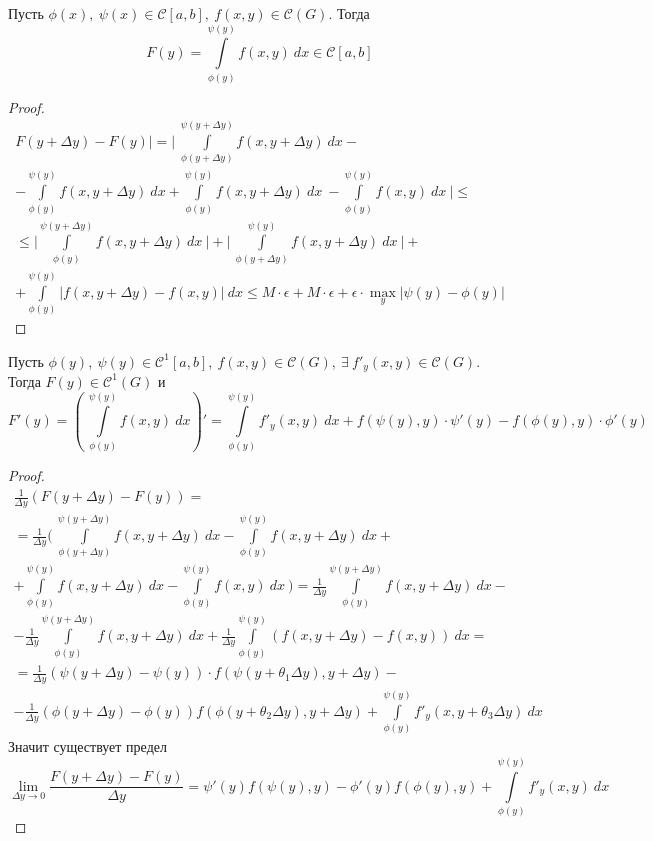 \begin{theorem}
    Пусть $\phi(x),\ \psi(x)\in \mathcal{C}[a,b],\ f(x,y)\in \mathcal{C}(G)$. Тогда
    \[F(y)=\int\limits_{\phi(y)}^{\psi(y)}f(x,y)\ dx\in \mathcal{C}[a,b]\]
\end{theorem}
\begin{proof}
    \begin{multline*}
        F(y+\Delta y)-F(y)|=\Bigg|\ \int\limits_{\phi(y+\Delta y)}^{\psi(y+\Delta y)}f(x,y+\Delta y)\ dx-\\-
        \int\limits_{\phi(y)}^{\psi(y)}f(x,y+\Delta y)\ dx+\int\limits_{\phi(y)}^{\psi(y)}f(x,y+\Delta y)\ dx\ -\int\limits_{\phi(y)}^{\psi(y)}f(x,y)\ dx\ \Bigg|\leq\\
        \leq \Bigg|\int\limits_{\phi(y)}^{\psi(y+\Delta y)}f(x,y+\Delta y)\ dx\ \Bigg|+\Bigg|\ \int\limits_{\phi(y+\Delta y)}^{\psi(y)}f(x,y+\Delta y)\ dx\ \Bigg|+\\
        +\int\limits_{\phi(y)}^{\psi(y)}|f(x,y+\Delta y)-f(x,y)|\ dx\leq M\cdot \epsilon+M\cdot \epsilon+\epsilon\cdot \max\limits_{y}|\psi(y)-\phi(y)|
    \end{multline*}
    
\end{proof}
\begin{theorem}
    Пусть $\phi(y),\ \psi(y)\in \mathcal{C}^1[a,b],\ f(x,y)\in \mathcal{C}(G),\ \exists\ f'_y(x,y)\in \mathcal{C}(G)$. Тогда $F(y)\in \mathcal{C}^1(G)$ и
    \[F'(y)=\left(\ \int\limits_{\phi(y)}^{\psi(y)}f(x,y)\ dx\right)'=\int\limits_{\phi(y)}^{\psi(y)}f'_y(x,y)\ dx+f(\psi(y),y)\cdot \psi'(y)-f(\phi(y),y)\cdot \phi'(y)\]
\end{theorem}
\begin{proof}
    \begin{multline*}
        \frac{1}{\Delta y}(F(y+\Delta y)-F(y))=\\
        =\frac{1}{\Delta y}\Bigg(\ \int\limits_{\phi(y+\Delta y)}^{\psi(y+\Delta y)}f(x,y+\Delta y)\ dx-\int\limits_{\phi(y)}^{\psi(y)}f(x,y+\Delta y)\ dx+\\
        + \int\limits_{\phi(y)}^{\psi(y)}f(x,y+\Delta y)\ dx-\int\limits_{\phi(y)}^{\psi(y)}f(x,y)\ dx\ \Bigg)=\frac{1}{\Delta y}\int\limits_{\phi(y)}^{\psi(y+\Delta y)}f(x,y+\Delta y)\ dx-\\
        -\frac{1}{\Delta y}\int\limits_{\phi(y)}^{\psi(y+\Delta y)}f(x,y+\Delta y)\ dx +\frac{1}{\Delta y} \int\limits_{\phi(y)}^{\psi(y)}(f(x,y+\Delta y)-f(x,y))\ dx=\\
        =\frac{1}{\Delta y}(\psi(y+\Delta y)-\psi(y))\cdot f(\psi(y+\theta_1\Delta y), y+\Delta y)-\\
        -\frac{1}{\Delta y}(\phi(y+\Delta y)-\phi(y))f(\phi(y+\theta_2\Delta y), y+\Delta y)+\int\limits_{\phi(y)}^{\psi(y)}f'_y(x,y+\theta_3\Delta y)\ dx
    \end{multline*}
    Значит существует предел
    \[\lim\limits_{\Delta y\to 0}\frac{F(y+\Delta y)-F(y)}{\Delta y}=\psi'(y)f(\psi(y),y)-\phi'(y)f(\phi(y),y)+\int\limits_{\phi(y)}^{\psi(y)}f'_y(x,y)\ dx\]
\end{proof}
